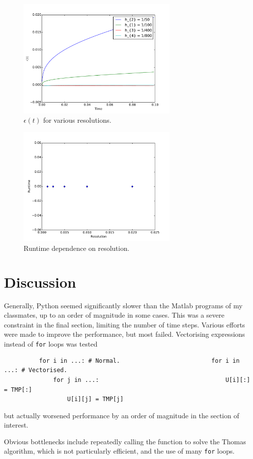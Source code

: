 \documentclass{article}
\begin{document}
\begin{figure}
  \centering
  \includegraphics[width=0.7\textwidth]{2/4/plot.pdf}
  \caption{$\epsilon(t)$ for various resolutions.}
  \label{f:41}
\end{figure}

\begin{figure}
  \centering
  \includegraphics[width=0.7\textwidth]{2/4/resolution.pdf}
  \caption{Runtime dependence on resolution.}
  \label{f:42}
\end{figure}

\section*{Discussion}
Generally, Python seemed significantly slower than the Matlab programs of my classmates, up to an order
of magnitude in some cases. This was a severe constraint in the final section, limiting the number of time
steps.
Various efforts were made to improve the performance, but most failed. Vectorising expressions instead of \verb+for+
loops was tested
\begin{verbatim}
          for i in ...: # Normal.                          for i in ...: # Vectorised.
              for j in ...:                                    U[i][:] = TMP[:]
                  U[i][j] = TMP[j]
\end{verbatim}
but actually worsened performance by an order of magnitude in the section of interest.

Obvious bottlenecks include repeatedly calling the function to solve the Thomas algorithm, which
is not particularly efficient, and the use of many \verb+for+ loops.
\end{document}
